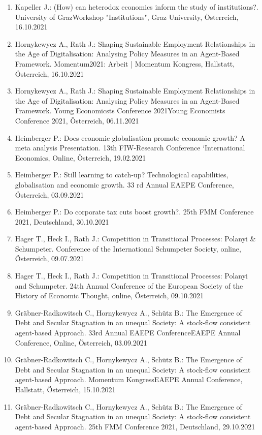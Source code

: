 \begin{enumerate}
	\item Kapeller J.: (How) can heterodox economics inform the study of institutions?. University of GrazWorkshop "Institutions", Graz University, Österreich, 16.10.2021
	\item Hornykewycz A., Rath J.: Shaping Sustainable Employment Relationships in the Age of Digitalisation: Analysing Policy Measures in an Agent-Based Framework. Momentum2021: Arbeit | Momentum Kongress, Hallstatt, Österreich, 16.10.2021
	\item Hornykewycz A., Rath J.: Shaping Sustainable Employment Relationships in the Age of Digitalisation: Analysing Policy Measures in an Agent-Based Framework. Young Economicsts Conference 2021Young Economists Conference 2021, Österreich, 06.11.2021
	\item Heimberger P.: Does economic globalisation promote economic growth? A meta analysis Presentation. 13th FIW-Research Conference ‘International Economics, Online, Österreich, 19.02.2021
	\item Heimberger P.: Still learning to catch-up? Technological capabilities, globalisation and economic growth. 33 rd Annual EAEPE Conference, Österreich, 03.09.2021
	\item Heimberger P.: Do corporate tax cuts boost growth?. 25th FMM Conference 2021, Deutschland, 30.10.2021
	\item Hager T., Heck I., Rath J.: Competition in Transitional Processes: Polanyi & Schumpeter. Conference of the International Schumpeter Society, online, Österreich, 09.07.2021
	\item Hager T., Heck I., Rath J.: Competition in Transitional Processes: Polanyi and Schumpeter. 24th Annual Conference of the European Society of the History of Economic Thought, online, Österreich, 09.10.2021
	\item Gräbner-Radkowitsch C., Hornykewycz A., Schütz B.: The Emergence of Debt and Secular Stagnation in an unequal Society: A stock-flow consistent agent-based Approach. 33rd Annual EAEPE ConferenceEAEPE Annual Conference, Online, Österreich, 03.09.2021
	\item Gräbner-Radkowitsch C., Hornykewycz A., Schütz B.: The Emergence of Debt and Secular Stagnation in an unequal Society: A stock-flow consistent agent-based Approach. Momentum KongressEAEPE Annual Conference, Hallstatt, Österreich, 15.10.2021
	\item Gräbner-Radkowitsch C., Hornykewycz A., Schütz B.: The Emergence of Debt and Secular Stagnation in an unequal Society: A stock-flow consistent agent-based Approach. 25th FMM Conference 2021, Deutschland, 29.10.2021

\end{enumerate}
